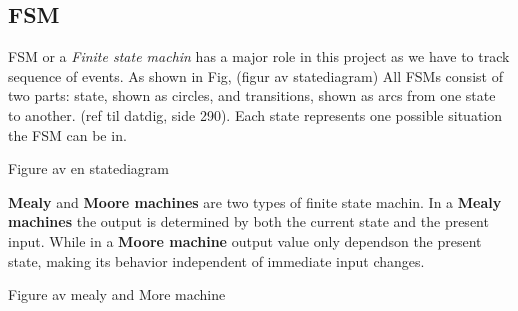 \subsection{FSM} \label{FSM}
FSM or a \emph{Finite state machin} has a major role in this project as we have to track sequence of events. As shown in Fig, (figur av statediagram) All FSMs consist of two parts: state, shown as circles, and transitions, shown as arcs from one state to another. (ref til datdig, side 290). Each state represents one possible situation the FSM can be in.

Figure av en statediagram

\textbf{Mealy} and \textbf{Moore machines} are two types of finite state machin. In a \textbf{Mealy machines} the output is determined by both the current state and the present input. While in a \textbf{Moore machine} output value only dependson the present state, making its behavior independent of immediate input changes.

Figure av mealy and More machine


